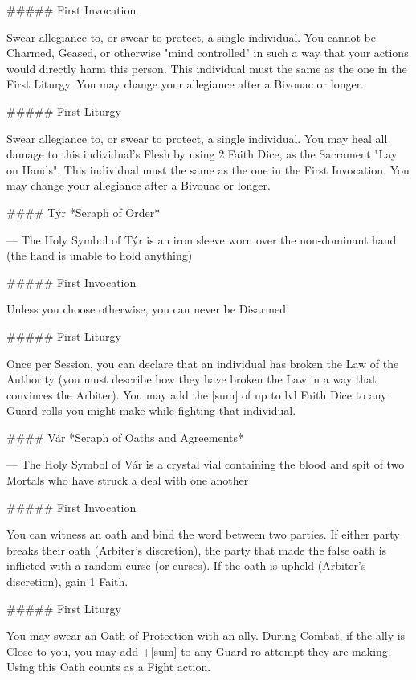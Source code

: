 ##### First Invocation

Swear allegiance to, or swear to protect, a single individual.  You cannot be Charmed, Geased, or otherwise "mind controlled" in such a way that your actions would directly harm this person.  This individual must the same as the one in the First Liturgy.  You may change your allegiance after a Bivouac or longer.

##### First Liturgy

Swear allegiance to, or swear to protect, a single individual.  You may heal all damage to this individual's Flesh by using 2 Faith Dice, as the Sacrament "Lay on Hands",  This individual must the same as the one in the First Invocation.  You may change your allegiance after a Bivouac or longer.




#### Týr
*Seraph of Order*

---
The Holy Symbol of Týr is an iron sleeve worn over the non-dominant hand (the hand is unable to hold anything)

##### First Invocation

Unless you choose otherwise, you can never be Disarmed

##### First Liturgy

Once per Session, you can declare that an individual has broken the Law of the Authority (you must describe how they have broken the Law in a way that convinces the Arbiter).  You may add the [sum] of up to {lvl} Faith Dice to any Guard rolls you might make while fighting that individual.






#### Vár
*Seraph of Oaths and Agreements*

---
The Holy Symbol of Vár is a crystal vial containing the blood and spit of two Mortals who have struck a deal with one another

##### First Invocation

You can witness an oath and bind the word between two parties.  If either party breaks their oath (Arbiter's discretion), the party that made the false oath is inflicted with a random curse (or curses).  If the oath is upheld (Arbiter's discretion), gain 1 Faith.

##### First Liturgy

You may swear an Oath of Protection with an ally. During Combat, if the ally is Close to you, you may add +[sum] to any Guard {ro} attempt they are making. Using this Oath counts as a Fight action.



